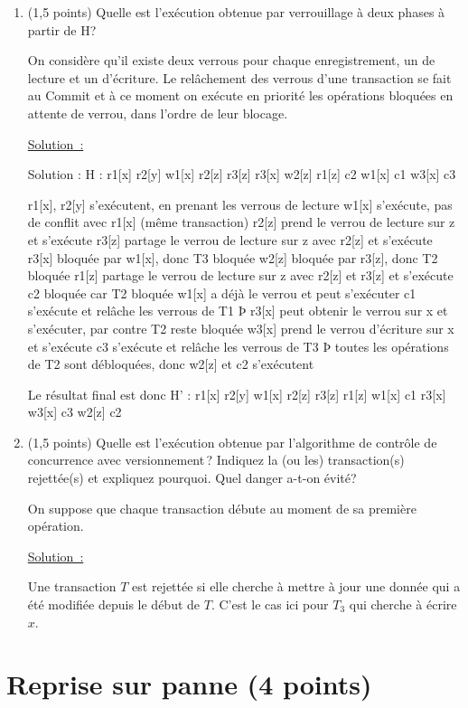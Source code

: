 \documentclass[french]{article}
\newenvironment{solution}{\nopagebreak\par\vspace*{2mm}\underline{Solution~:}\em\par}{\par\vspace*{2mm}}
\begin{document}
\begin{enumerate}
\item (1,5 points) Quelle est l'exécution obtenue par verrouillage à 
       deux phases à partir de H?

      On considère qu'il existe deux verrous pour chaque enregistrement, un de
      lecture et un d'écriture. Le relâchement des verrous d'une transaction se
      fait au Commit et à ce moment on exécute en priorité les opérations
      bloquées en attente de verrou, dans l'ordre de leur blocage.
\begin{solution}
      Solution : H : r1[x] r2[y] w1[x] r2[z] r3[z] r3[x] w2[z] r1[z] c2 w1[x] c1 w3[x] c3

      r1[x], r2[y] s'exécutent, en prenant les verrous de lecture
      w1[x] s'exécute, pas de conflit avec r1[x] (même transaction)
      r2[z] prend le verrou de lecture sur z et s'exécute
      r3[z] partage le verrou de lecture sur z avec r2[z] et s'exécute
      r3[x] bloquée par w1[x], donc T3 bloquée
      w2[z] bloquée par r3[z], donc T2 bloquée
      r1[z] partage le verrou de lecture sur z avec r2[z] et r3[z] et s'exécute
      c2 bloquée car T2 bloquée
      w1[x] a déjà le verrou et peut s'exécuter
      c1 s'exécute et relâche les verrous de T1 Þ r3[x] peut obtenir le verrou sur x et s'exécuter, par contre T2 reste bloquée
      w3[x] prend le verrou d'écriture sur x et s'exécute
      c3 s'exécute et relâche les verrous de T3 Þ toutes les opérations de T2 sont débloquées, donc w2[z] et c2 s'exécutent

      Le résultat final est donc H' : r1[x] r2[y] w1[x] r2[z] r3[z] r1[z] w1[x]
      c1 r3[x] w3[x] c3 w2[z] c2
\end{solution}

\item (1,5 points) Quelle est l'exécution obtenue par l'algorithme
       de contrôle de concurrence avec versionnement\,? Indiquez
         la (ou les)  transaction(s) rejettée(s) et expliquez
          pourquoi. Quel danger a-t-on évité?

         On suppose que chaque transaction débute
         au moment de sa première opération.

\begin{solution}
Une transaction $T$ est rejettée si elle cherche à mettre à
jour une donnée qui a été modifiée depuis le début de $T$.
C'est le cas ici pour $T_3$ qui cherche à écrire $x$.
\end{solution}
\end{enumerate}

\section{Reprise sur panne (4 points)}
\end{document}
